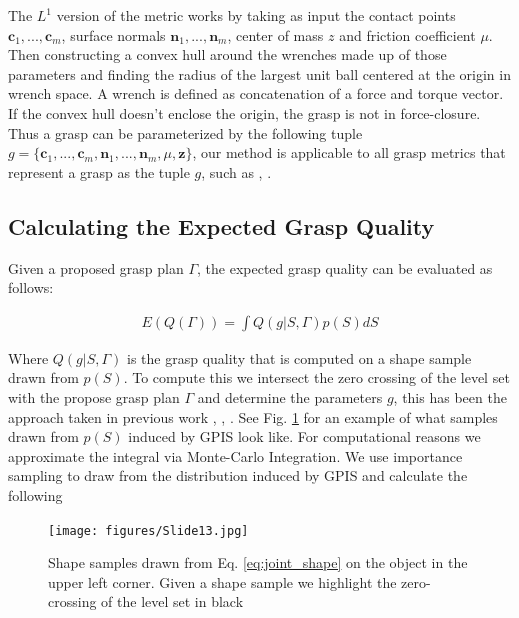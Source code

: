 \documentclass[letterpaper, 10 pt, conference]{ieeeconf}  %
\begin{document}
The $L^1$ version of the metric works by taking as input the contact points $\textbf{c}_1,...,\textbf{c}_m$, surface normals $\textbf{n}_1,...,\textbf{n}_m$, center of mass $z$ and friction coefficient $\mu$. Then constructing a convex hull around the wrenches made up of those parameters and finding the radius of the largest unit ball centered at the origin in wrench space. A wrench is defined as concatenation of a force and torque vector.  If the convex hull doesn't enclose the origin, the grasp is not in force-closure. Thus a grasp can be parameterized by the following tuple $g = \lbrace \textbf{c}_1,...,\textbf{c}_m,\textbf{n}_1,...,\textbf{n}_m,\mu, \textbf{z} \rbrace$, our method is applicable to all grasp metrics that represent a grasp as the tuple $g$, such as \cite{christopoulos2007handling}, \cite{li1988task}. 

\subsection{Calculating the Expected Grasp Quality}
Given a proposed grasp plan $\Gamma$, the expected grasp quality can be evaluated as follows:

\vspace{-2ex}
\begin{align}\label{eq:shape_sampling}
E(Q(\Gamma)) = \int Q(g|S,\Gamma) p(S) dS
\end{align}



Where $Q(g|S,\Gamma)$ is the grasp quality that is computed on a shape sample drawn from $p(S)$. To compute this we intersect the zero crossing of the level set with the propose grasp plan $\Gamma$ and determine the parameters $g$, this has been the approach taken in previous work  \cite{kehoe2012estimating}, \cite{kehoe2012toward},  \cite{christopoulos2007handling}. See Fig. \ref{fig:shape_samples} for an example of what samples drawn from $p(S)$ induced by GPIS look like. For computational reasons we approximate the integral via Monte-Carlo Integration. We use importance sampling to draw from the distribution induced by GPIS and calculate the following

\begin{figure}[ht!]
\centering
\texttt{[image: figures/Slide13.jpg]}
\caption{Shape samples drawn from Eq. \ref{eq:joint_shape} on the object in the upper left corner. Given a shape sample we highlight the zero-crossing of the level set in black}
\vspace*{-10pt}
\label{fig:shape_samples}
\end{figure}
\end{document}
